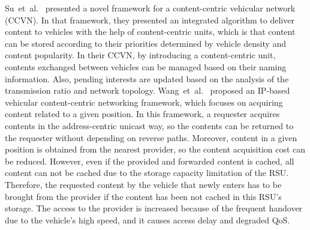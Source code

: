 \documentclass{ieeeaccess}
\begin{document}
Su~et~al.~\cite{Su2017} presented a novel framework for a content-centric vehicular network (CCVN). In that framework, they presented an integrated algorithm to deliver content to vehicles with the help of content-centric units, which is that content can be stored according to their priorities determined by vehicle density and content popularity. In their CCVN, by introducing a content-centric unit, contents exchanged between vehicles can be managed based on their naming information. Also, pending interests are updated based on the analysis of the transmission ratio and network topology.
Wang~et~al.~\cite{Wang2019} proposed an IP-based vehicular content-centric networking framework, which focuses on acquiring content related to a given position. In this framework, a requester acquires contents in the address-centric unicast way, so the contents can be returned to the requester without depending on reverse paths. Moreover, content in a given position is obtained from the nearest provider, so the content acquisition cost can be reduced.
However, even if the provided and forwarded content is cached, all content can not be cached due to the storage capacity limitation of the RSU.
Therefore, the requested content by the vehicle that newly enters has to be brought from the provider if the content has been not cached in this RSU's storage.
The access to the provider is increased because of the frequent handover due to the vehicle's high speed, and it causes access delay and degraded QoS.
\end{document}
